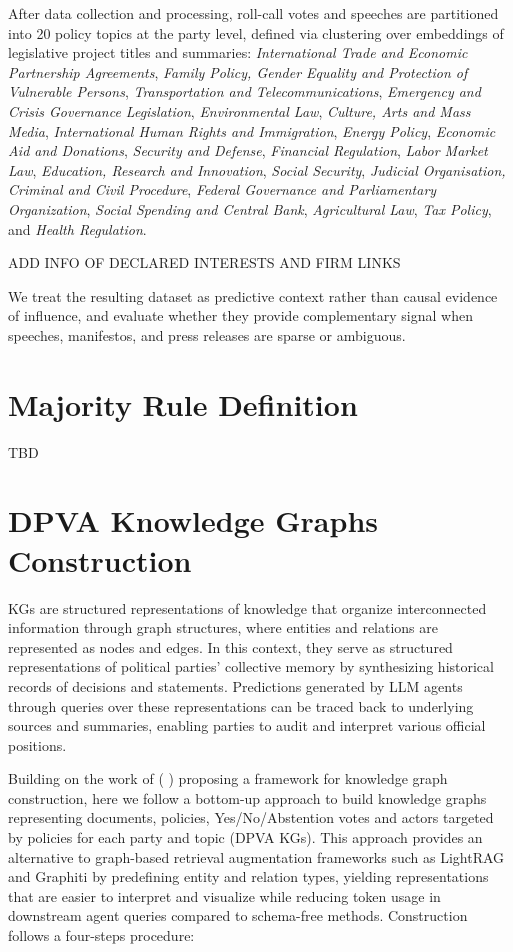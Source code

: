 \documentclass[letterpaper]{article}
\begin{document}
After data collection and processing, roll-call votes and speeches are partitioned 
into 20 policy topics at the party level, defined via clustering over embeddings of 
legislative project titles and summaries:
\emph{International Trade and Economic Partnership Agreements},
\emph{Family Policy, Gender Equality and Protection of Vulnerable Persons},
\emph{Transportation and Telecommunications},
\emph{Emergency and Crisis Governance Legislation},
\emph{Environmental Law},
\emph{Culture, Arts and Mass Media},
\emph{International Human Rights and Immigration},
\emph{Energy Policy},
\emph{Economic Aid and Donations},
\emph{Security and Defense},
\emph{Financial Regulation},
\emph{Labor Market Law},
\emph{Education, Research and Innovation},
\emph{Social Security},
\emph{Judicial Organisation, Criminal and Civil Procedure},
\emph{Federal Governance and Parliamentary Organization},
\emph{Social Spending and Central Bank},
\emph{Agricultural Law},
\emph{Tax Policy},
and \emph{Health Regulation}.

ADD INFO OF DECLARED INTERESTS AND FIRM LINKS

We treat the resulting dataset as predictive context rather than causal evidence of influence, and evaluate whether they provide complementary signal when speeches, manifestos, and press releases are sparse or ambiguous.

\section{Majority Rule Definition}

TBD

\section{DPVA Knowledge Graphs Construction}

KGs are structured representations of knowledge that organize interconnected information through graph structures, where entities and relations are represented as nodes and edges. In this context, they serve as structured representations of political parties’ collective memory by synthesizing historical records of decisions and statements. Predictions generated by LLM agents through queries over these representations can be traced back to underlying sources and summaries, enabling parties to audit and interpret various official positions. 

Building on the work of \citeauthor{zhang2024extract} ( \citeyear{zhang2024extract}) proposing a framework for knowledge graph construction, here we follow a bottom-up approach to build knowledge graphs representing documents, policies, Yes/No/Abstention votes and actors targeted by policies for each party and topic (DPVA KGs). This approach provides an alternative to graph-based retrieval augmentation frameworks such as LightRAG \citep{guo2024lightrag} and Graphiti \citep{rasmussen2025zep} by predefining entity and relation types, yielding representations that are easier to interpret and visualize while reducing token usage in downstream agent queries compared to schema-free methods.
Construction follows a four-steps procedure:
\end{document}
